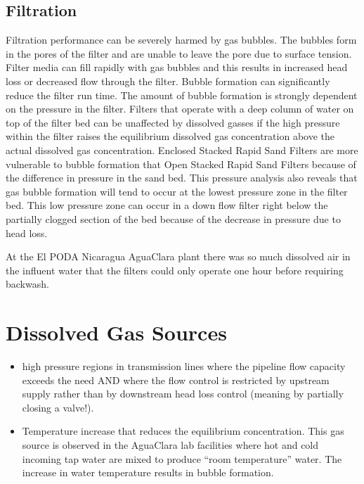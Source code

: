 \documentclass[letterpaper,10pt,english]{sphinxmanual}
\begin{document}
{\subsection{Filtration}
\label{\detokenize{Dissolved_Gas/DG_Intro:filtration}}\label{\detokenize{Dissolved_Gas/DG_Intro:heading-dg-filtration}}
Filtration performance can be severely harmed by gas bubbles. The bubbles form in the pores of the filter and are unable to leave the pore due to surface tension. Filter media can fill rapidly with gas bubbles and this results in increased head loss or decreased flow through the filter. Bubble formation can significantly reduce the filter run time. The amount of bubble formation is strongly dependent on the pressure in the filter. Filters that operate with a deep column of water on top of the filter bed can be unaffected by dissolved gasses if the high pressure within the filter raises the equilibrium dissolved gas concentration above the actual dissolved gas concentration. Enclosed Stacked Rapid Sand Filters are more vulnerable to bubble formation that Open Stacked Rapid Sand Filters because of the difference in pressure in the sand bed. This pressure analysis also reveals that gas bubble formation will tend to occur at the lowest pressure zone in the filter bed. This low pressure zone can occur in a down flow filter right below the partially clogged section of the bed because of the decrease in pressure due to head loss.

At the El PODA Nicaragua AguaClara plant there was so much dissolved air in the influent water that the filters could only operate one hour before requiring backwash.


\section{Dissolved Gas Sources}
\label{\detokenize{Dissolved_Gas/DG_Intro:dissolved-gas-sources}}\label{\detokenize{Dissolved_Gas/DG_Intro:heading-dissolved-gas-sources}}\begin{itemize}
\item {} 
high pressure regions in transmission lines where the pipeline flow capacity exceeds the need AND where the flow control is restricted by upstream supply rather than by downstream head loss control (meaning by partially closing a valve!).

\item {} 
Temperature increase that reduces the equilibrium concentration. This gas source is observed in the AguaClara lab facilities where hot and cold incoming tap water are mixed to produce “room temperature” water. The increase in water temperature results in bubble formation.


\end{itemize}}
\end{document}
